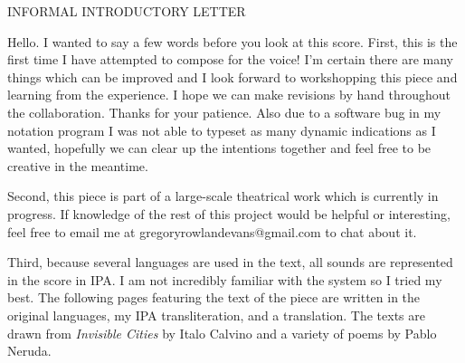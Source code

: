 \documentclass[11pt]{article}
\begin{document}
\begin{center}
\huge INFORMAL INTRODUCTORY LETTER
\end{center}

Hello. I wanted to say a few words before you look at this score. First, this is the first time I have attempted to compose for the voice! I'm certain there are many things which can be improved and I look forward to workshopping this piece and learning from the experience. I hope we can make revisions by hand throughout the collaboration. Thanks for your patience. Also due to a software bug in my notation program I was not able to typeset as many dynamic indications as I wanted, hopefully we can clear up the intentions together and feel free to be creative in the meantime.

Second, this piece is part of a large-scale theatrical work which is currently in progress. If knowledge of the rest of this project would be helpful or interesting, feel free to email me at gregoryrowlandevans@gmail.com to chat about it.

Third, because several languages are used in the text, all sounds are represented in the score in IPA. I am not incredibly familiar with the system so I tried my best. The following pages featuring the text of the piece are written in the original languages, my IPA transliteration, and a translation. The texts are drawn from \textit{Invisible Cities} by Italo Calvino and a variety of poems by Pablo Neruda.
\end{document}
